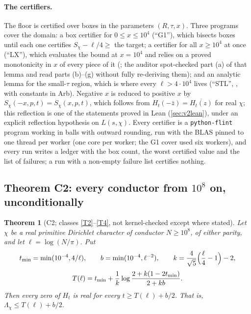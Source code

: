 \documentclass[11pt]{article}
\newtheorem{theorem}{Theorem}[section]
\theoremstyle{definition}
\newcommand{\lean}[1]{\texttt{#1}}
\newcommand{\Lc}{\Lambda}
\begin{document}
\paragraph{The certifiers.} The floor is certified over boxes in the parameters $(R, \tau, x)$. Three programs cover the domain: a box certifier for $0 \le x \le 10^4$ (``G1''), which bisects boxes until each one certifies $S_\chi - \ell/4 \ge$ the target; a certifier for all $x \ge 10^4$ at once (``LX''), which evaluates the bound at $x = 10^4$ and relies on a proved monotonicity in $x$ of every piece of it (\cite[P5 memo \S A.9.2]{dq1records}; the auditor spot-checked part (a) of that lemma and read parts (b)--(g) without fully re-deriving them); and an analytic lemma for the small-$\tau$ region, which is where every $\ell > 4\cdot10^4$ lives (``STL'', \cite[P5 memo \S A.9.3]{dq1records}, with constants in Arb). Negative $x$ is reduced to positive $x$ by $S_\chi(-x,p,t) = S_\chi(x,p,t)$, which follows from $H_t(-\bar z) = \overline{H_t(z)}$ for real $\chi$; this reflection is one of the statements proved in Lean (\cref{sec:v2lean}), under an explicit reflection hypothesis on $L(s,\chi)$. Every certifier is a \lean{python-flint} program working in balls with outward rounding, run with the BLAS pinned to one thread per worker (one core per worker; the G1 cover used six workers), and every run writes a ledger with the box count, the worst certified value and the list of failures; a run with a non-empty failure list certifies nothing.

\subsection{Theorem C2: every conductor from $10^8$ on, unconditionally}\label{sec:C2}

\begin{theorem}[C2; classes \ref{T2}--\ref{T4}, not kernel-checked except where stated]\label{thm:C2}
Let $\chi$ be a real primitive Dirichlet character of conductor $N \ge 10^8$, of either parity, and let $\ell = \log(N/\pi)$. Put
\begin{equation}\label{eq:C2bound}
\begin{gathered}
t_{\min} = \min(10^{-4}, 4/\ell),\qquad b = \min(10^{-4}, \ell^{-2}),\qquad k = \frac{4}{\sqrt5}\Bigl(\frac{\ell}{4} - 1\Bigr) - 2,\\[2pt]
T(\ell) = t_{\min} + \frac1k\log\frac{2 + k(1 - 2t_{\min})}{2 + kb}.
\end{gathered}
\end{equation}
Then every zero of $H_t$ is real for every $t \ge T(\ell) + b/2$. That is, $\Lc_\chi \le T(\ell) + b/2$.
\end{theorem}
\end{document}
